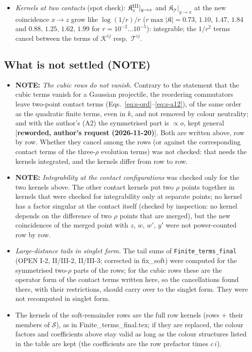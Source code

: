 {\begin{itemize}
\item \emph{Kernels at two contacts} (spot check): $\mathfrak{K}^{\rm III}_{z}|_{y\to x}$ and $\mathfrak{K}_{\mathcal{T}}|_{y\to x}$ at the new coincidence $x\to z$ grow like $\log(1/r)/r$ ($r\max|\mathfrak{K}|=0.73,\,1.10,\,1.47,\,1.84$ and $0.88,\,1.25,\,1.62,\,1.99$ for $r=10^{-2}\dots10^{-5}$): integrable; the $1/r^{2}$ terms cancel between the terms of $\mathcal{K}^{ij}$ resp.\ $\mathcal{T}^{ij}$.
\end{itemize}

\subsection{What is not settled (NOTE)}
\begin{itemize}
\item[(1)] \textbf{NOTE:} \emph{The cubic rows do not vanish.} Contrary to the statement that the cubic terms vanish for a Gaussian projectile, the reordering commutators leave two-point contact terms (Eqs.~\eqref{eq:s-ord}--\eqref{eq:s-a12}), of the same order as the quadratic finite terms, even in $k$, and not removed by colour neutrality; and with the author's (A2) the symmetrised part is $\propto o$, kept general [\textbf{reworded, author's request (2026-11-20)}]. Both are written above, row by row. Whether they cancel among the rows (or against the corresponding contact terms of the three-$\rho$ evolution terms) was not checked: that needs the kernels integrated, and the kernels differ from row to row.
\item[(2)] \textbf{NOTE:} \emph{Integrability at the contact configurations} was checked only for the two kernels above. The other contact kernels put two $\rho$ points together in kernels that were checked for integrability only at separate points; no kernel has a factor singular at the contact itself (checked by inspection: no kernel depends on the difference of two $\rho$ points that are merged), but the new coincidences of the merged point with $z$, $w$, $w'$, $y'$ were not power-counted row by row.
\item[(3)] \emph{Large-distance tails in singlet form.} The tail sums of \texttt{Finite\_terms\_final} (OPEN I-2, II/III-2, II/III-3; corrected in fix\_soft) were computed for the symmetrised two-$\rho$ parts of the rows; for the cubic rows these are the operator form of the contact terms written here, so the cancellations found there, with their restrictions, should carry over to the singlet form. They were not recomputed in singlet form.
\item[(4)] The kernels of the soft-remainder rows are the full row kernels (rows $+$ their members of $\mathcal{S}$), as in Finite\_terms\_final.tex; if they are replaced, the colour factors and coefficients above stay valid as long as the colour structures listed in the table are kept (the coefficients are the row prefactor times $c\,i$).

\end{itemize}}
